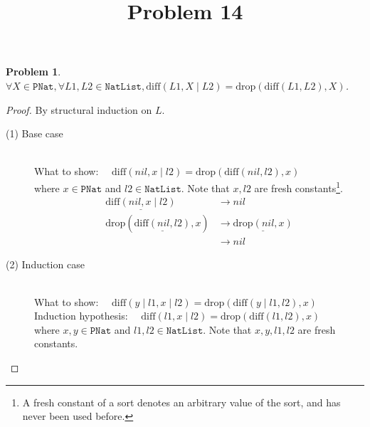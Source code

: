 \documentclass[12pt, a4paper]{article}
\title{Problem 14}
\date{\vspace{-5ex}}
\newtheorem{problem}{Problem}
\newcommand{\rmx}[1]{\mathrm{#1}}
\newcommand{\larrow}{\longrightarrow}
\newcommand{\under}{\underline}
\begin{document}
\maketitle

\begin{problem}
$\forall X \in \mathtt{PNat}, \forall L1, L2 \in \mathtt{NatList}, \rmx{diff}(L1, X \mid L2) = \rmx{drop}(\rmx{diff}(L1, L2), X)$.
\end{problem}
\begin{proof}
By structural induction on $L$.
\begin{description}
\item[(1) Base case]~\\
\noindent
What to show: $\quad \rmx{diff}(nil, x \mid l2) = \rmx{drop}(\rmx{diff}(nil, l2), x)$\\
where $x \in \mathtt{PNat}$ and $l2 \in \mathtt{NatList}$.
Note that $x, l2$ are fresh constants\footnote{A fresh constant of a sort denotes an arbitrary value of the sort, and has never been used before.}.
\begin{align*}
\under{\rmx{diff}(nil, x \mid l2)} 
	&\larrow nil \tag{by diff1} \\
\rmx{drop}(\under{\rmx{diff}(nil, l2)}, x)
	&\larrow \under{\rmx{drop}(nil, x)} \tag{by diff1} \\
	&\larrow nil \tag{by drop1}
\end{align*}

\item[(2) Induction case]~\\
What to show: $\quad \rmx{diff}(y \mid l1, x \mid l2) = \rmx{drop}(\rmx{diff}(y \mid l1, l2), x)$ \\
Induction hypothesis: $\quad \rmx{diff}(l1, x \mid l2) = \rmx{drop}(\rmx{diff}(l1, l2), x)$  \\
where $x,y \in \mathtt{PNat}$ and $l1, l2 \in \mathtt{NatList}$.
Note that $x, y, l1, l2$ are fresh constants.


\end{description}
\end{proof}
\end{document}
